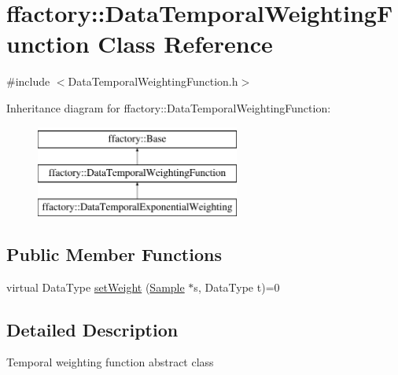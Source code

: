 \hypertarget{classffactory_1_1_data_temporal_weighting_function}{\section{ffactory\-:\-:Data\-Temporal\-Weighting\-Function Class Reference}
\label{classffactory_1_1_data_temporal_weighting_function}
}


{\ttfamily \#include $<$Data\-Temporal\-Weighting\-Function.\-h$>$}

Inheritance diagram for ffactory\-:\-:Data\-Temporal\-Weighting\-Function\-:\begin{figure}[H]
\begin{center}
\leavevmode
\includegraphics[height=3.000000cm]{classffactory_1_1_data_temporal_weighting_function}
\end{center}
\end{figure}
\subsection*{Public Member Functions}
\begin{DoxyCompactItemize}
\item 
virtual Data\-Type \hyperlink{classffactory_1_1_data_temporal_weighting_function_a9388ef364b911239b8cdaa1f24d35f7b}{set\-Weight} (\hyperlink{classffactory_1_1_sample}{Sample} $\ast$s, Data\-Type t)=0
\end{DoxyCompactItemize}


\subsection{Detailed Description}
Temporal weighting function abstract class 

